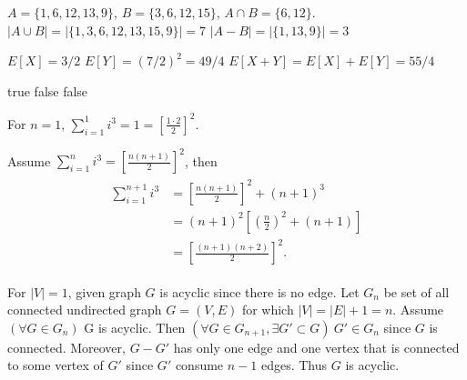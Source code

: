 \documentclass[12pt,twoside]{article}
\begin{document}

\begin{problems}

\problem  %

\begin{problemparts}
  \problempart %
  $A = \{1, 6, 12, 13, 9\}$, $B = \{3, 6, 12, 15\}$, $A \cap B = \{6, 12\}$.
  \problempart %
  $|A \cup B| = |\{1, 3, 6, 12, 13, 15, 9\}| = 7$
  \problempart %
  $|A - B| = |\{1, 13, 9\}| = 3$
\end{problemparts}

\problem  %

\begin{problemparts}
  \problempart %
  $E[X] = 3/2$
  \problempart %
  $E[Y] = (7/2)^2 = 49/4$
  \problempart %
  $E[X + Y] = E[X] + E[Y] = 55/4$
\end{problemparts}

\problem  %

\begin{problemparts}
  \problempart %
  true
  \problempart %
  false
  \problempart %
  false
\end{problemparts}

\problem  %

For $n = 1$, $\sum_{i=1}^1 i^3 = 1 = \left[\frac{1\cdot2}{2}\right]^2$.

Assume $\sum_{i=1}^n i^3 = \left[\frac{n(n+1)}{2}\right]^2$, then
\begin{align}
    \begin{split}
      \sum_{i=1}^{n+1} i^3 &= \left[\frac{n(n+1)}{2}\right]^2 + (n+1)^3 \\
                           &= (n+1)^2\left[\left(\frac{n}{2}\right)^2 + (n+1)\right] \\
                           &= \left[\frac{(n+1)(n+2)}{2}\right]^2.
    \end{split}
\end{align}

\newpage
\problem  %

For $|V| = 1$, given graph $G$ is acyclic since there is no edge. Let
$G_n$ be set of all connected undirected graph $G = (V, E)$ for which
$|V| = |E| + 1 = n$. Assume $(\forall G\in G_n)$ G is acyclic. Then
$(\forall G\in G_{n+1}, \exists G'\subset G)\ G'\in G_n$ since $G$ is connected.
Moreover, $G - G'$ has only one edge and one vertex that is connected to some
vertex of $G'$ since $G'$ consume $n-1$ edges. Thus $G$ is acyclic.


\end{problems}
\end{document}
